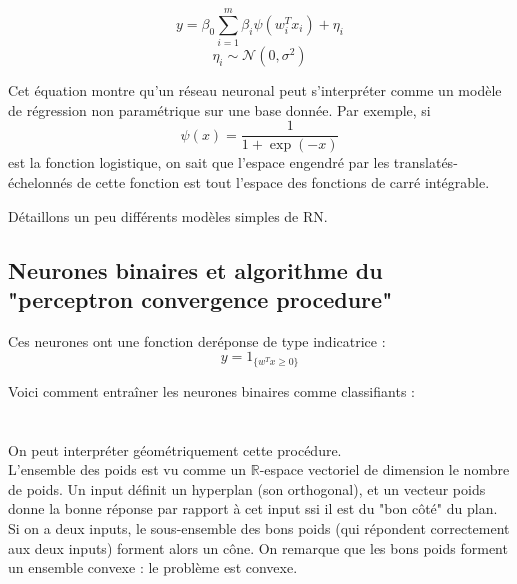 \documentclass{article}
\newcommand{\R}{\mathbb R}
\begin{document}
\[y=\beta_0 \sum_{i=1}^m \beta_i\psi(w_i^T x_i) + \eta_i\]
\[\eta_i \sim \mathcal N(0,\sigma^2)\]

Cet équation montre qu'un réseau neuronal peut s'interpréter comme un modèle de régression non paramétrique sur une base donnée. Par exemple, si 
\[\psi(x)=\frac{1}{1+\exp(-x)}\]
est la fonction logistique, on sait que l'espace engendré par les translatés-échelonnés de cette fonction est tout l'espace des fonctions de carré intégrable.


Détaillons un peu différents modèles simples de RN.

 \subsection{Neurones binaires et algorithme du "perceptron convergence procedure"}
Ces neurones ont une fonction deréponse de type indicatrice :
\[y=1_{\{w^Tx\geq 0\}}\]

Voici comment entraîner les neurones binaires comme classifiants :\\

\\
\\

On peut interpréter géométriquement cette procédure.\\

L'ensemble des poids est vu comme un $\R$-espace vectoriel de dimension le nombre de poids. Un input définit un hyperplan (son orthogonal), et un vecteur poids donne la bonne réponse par rapport à cet input ssi il est du "bon côté" du plan. Si on a deux inputs, le sous-ensemble des bons poids (qui répondent correctement aux deux inputs) forment alors un cône. On remarque que les bons poids forment un ensemble convexe : le problème est convexe.\\
\end{document}
